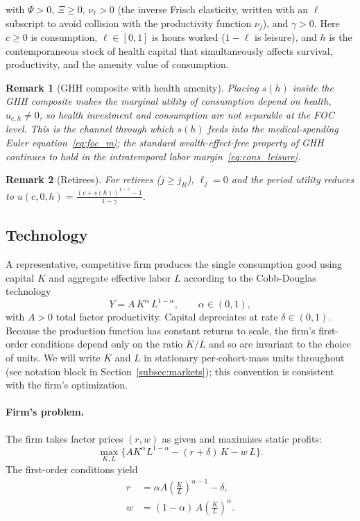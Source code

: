 \documentclass[12pt,a4paper]{article}
\newtheorem{remark}{Remark}
\begin{document}
with $\Psi > 0$, $\Xi \geq 0$, $\nu_\ell > 0$ (the inverse Frisch elasticity, written with an $\ell$ subscript to avoid collision with the productivity function $\nu_j$), and $\gamma > 0$. Here $c \geq 0$ is consumption, $\ell \in [0, 1]$ is hours worked ($1-\ell$ is leisure), and $h$ is the contemporaneous stock of health capital that simultaneously affects survival, productivity, and the amenity value of consumption.

\begin{remark}[GHH composite with health amenity]
\label{rem:ghh_amenity}
Placing $s(h)$ inside the GHH composite makes the marginal utility of consumption depend on health, $u_{c,h} \neq 0$, so health investment and consumption are not separable at the FOC level. This is the channel through which $s(h)$ feeds into the medical-spending Euler equation~\eqref{eq:foc_m}; the standard wealth-effect-free property of GHH continues to hold in the intratemporal labor margin~\eqref{eq:cons_leisure}.
\end{remark}

\begin{remark}[Retirees]
\label{rem:retirees}
For retirees ($j \geq j_R$), $\ell_j = 0$ and the period utility reduces to $u(c, 0, h) = \frac{(c + s(h))^{1-\gamma} - 1}{1-\gamma}$.
\end{remark}


\subsection{Technology}
\label{subsec:technology}

A representative, competitive firm produces the single consumption good using capital $K$ and aggregate effective labor $L$ according to the Cobb-Douglas technology
\begin{equation}
\label{eq:production}
Y = A\, K^\alpha\, L^{1-\alpha}, \qquad \alpha \in (0,1),
\end{equation}
with $A > 0$ total factor productivity. Capital depreciates at rate $\delta \in (0,1)$. Because the production function has constant returns to scale, the firm's first-order conditions depend only on the ratio $K/L$ and so are invariant to the choice of units. We will write $K$ and $L$ in stationary per-cohort-mass units throughout (see notation block in Section~\ref{subsec:markets}); this convention is consistent with the firm's optimization.
 
\paragraph{Firm's problem.}
The firm takes factor prices $(r, w)$ as given and maximizes static profits:
\begin{equation}
\label{eq:firm_problem}
\max_{K, L} \bigl\{A K^\alpha L^{1-\alpha} - (r+\delta)\,K - w\,L\bigr\}.
\end{equation}
The first-order conditions yield
\begin{align}
r &= \alpha A \left(\frac{K}{L}\right)^{\alpha-1} - \delta, \label{eq:foc_r} \\
w &= (1-\alpha)\, A \left(\frac{K}{L}\right)^{\alpha}. \label{eq:foc_w}
\end{align}
\end{document}

